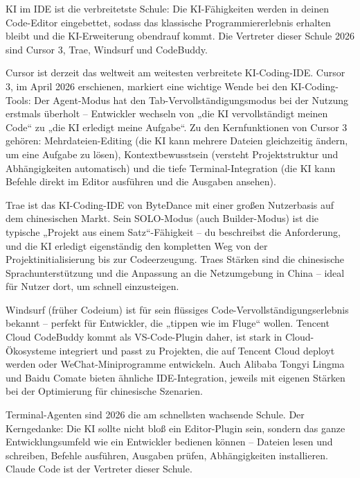 
KI im IDE ist die verbreitetste Schule: Die KI-Fähigkeiten werden in deinen Code-Editor eingebettet, sodass das klassische Programmiererlebnis erhalten bleibt und die KI-Erweiterung obendrauf kommt. Die Vertreter dieser Schule 2026 sind Cursor 3, Trae, Windsurf und CodeBuddy.


Cursor ist derzeit das weltweit am weitesten verbreitete KI-Coding-IDE. Cursor 3, im April 2026 erschienen, markiert eine wichtige Wende bei den KI-Coding-Tools: Der Agent-Modus hat den Tab-Vervollständigungsmodus bei der Nutzung erstmals überholt – Entwickler wechseln von „die KI vervollständigt meinen Code“ zu „die KI erledigt meine Aufgabe“. Zu den Kernfunktionen von Cursor 3 gehören: Mehrdateien-Editing (die KI kann mehrere Dateien gleichzeitig ändern, um eine Aufgabe zu lösen), Kontextbewusstsein (versteht Projektstruktur und Abhängigkeiten automatisch) und die tiefe Terminal-Integration (die KI kann Befehle direkt im Editor ausführen und die Ausgaben ansehen).


Trae ist das KI-Coding-IDE von ByteDance mit einer großen Nutzerbasis auf dem chinesischen Markt. Sein SOLO-Modus (auch Builder-Modus) ist die typische „Projekt aus einem Satz“-Fähigkeit – du beschreibst die Anforderung, und die KI erledigt eigenständig den kompletten Weg von der Projektinitialisierung bis zur Codeerzeugung. Traes Stärken sind die chinesische Sprachunterstützung und die Anpassung an die Netzumgebung in China – ideal für Nutzer dort, um schnell einzusteigen.


Windsurf (früher Codeium) ist für sein flüssiges Code-Vervollständigungserlebnis bekannt – perfekt für Entwickler, die „tippen wie im Fluge“ wollen. Tencent Cloud CodeBuddy kommt als VS-Code-Plugin daher, ist stark in Cloud-Ökosysteme integriert und passt zu Projekten, die auf Tencent Cloud deployt werden oder WeChat-Miniprogramme entwickeln. Auch Alibaba Tongyi Lingma und Baidu Comate bieten ähnliche IDE-Integration, jeweils mit eigenen Stärken bei der Optimierung für chinesische Szenarien.


Terminal-Agenten sind 2026 die am schnellsten wachsende Schule. Der Kerngedanke: Die KI sollte nicht bloß ein Editor-Plugin sein, sondern das ganze Entwicklungsumfeld wie ein Entwickler bedienen können – Dateien lesen und schreiben, Befehle ausführen, Ausgaben prüfen, Abhängigkeiten installieren. Claude Code ist der Vertreter dieser Schule.

